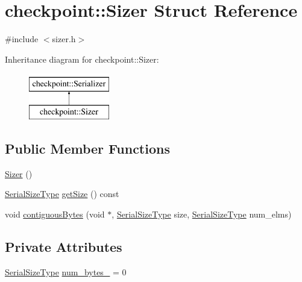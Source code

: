 \hypertarget{structcheckpoint_1_1_sizer}{}\section{checkpoint\+:\+:Sizer Struct Reference}
\label{structcheckpoint_1_1_sizer}


{\ttfamily \#include $<$sizer.\+h$>$}

Inheritance diagram for checkpoint\+:\+:Sizer\+:\begin{figure}[H]
\begin{center}
\leavevmode
\includegraphics[height=2.000000cm]{structcheckpoint_1_1_sizer}
\end{center}
\end{figure}
\subsection*{Public Member Functions}
\begin{DoxyCompactItemize}
\item 
\hyperlink{structcheckpoint_1_1_sizer_a17995329af9eec00859e86c6fabf4890}{Sizer} ()
\item 
\hyperlink{namespacecheckpoint_a083f6674da3f94c2901b18c6d238217c}{Serial\+Size\+Type} \hyperlink{structcheckpoint_1_1_sizer_a9cabfd6cafb49a79b645663c41e4c74a}{get\+Size} () const
\item 
void \hyperlink{structcheckpoint_1_1_sizer_a815b43e2422239df38ad4e324f1ffec0}{contiguous\+Bytes} (void $\ast$, \hyperlink{namespacecheckpoint_a083f6674da3f94c2901b18c6d238217c}{Serial\+Size\+Type} size, \hyperlink{namespacecheckpoint_a083f6674da3f94c2901b18c6d238217c}{Serial\+Size\+Type} num\+\_\+elms)
\end{DoxyCompactItemize}
\subsection*{Private Attributes}
\begin{DoxyCompactItemize}
\item 
\hyperlink{namespacecheckpoint_a083f6674da3f94c2901b18c6d238217c}{Serial\+Size\+Type} \hyperlink{structcheckpoint_1_1_sizer_a94e13ec6a5656d3b82dc787c00390bf2}{num\+\_\+bytes\+\_\+} = 0
\end{DoxyCompactItemize}
